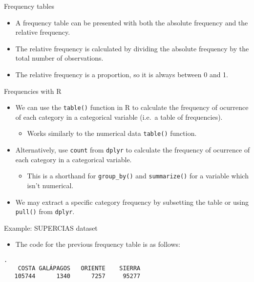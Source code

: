 \documentclass[
  10pt,
  ignorenonframetext,
]{beamer}
\newenvironment{Shaded}{\begin{snugshade}}{\end{snugshade}}
\newcommand{\FunctionTok}[1]{\textcolor[rgb]{0.28,0.35,0.67}{#1}}
\newcommand{\NormalTok}[1]{\textcolor[rgb]{0.00,0.23,0.31}{#1}}
\newcommand{\SpecialCharTok}[1]{\textcolor[rgb]{0.37,0.37,0.37}{#1}}
\providecommand{\tightlist}{%
  \setlength{\itemsep}{0pt}\setlength{\parskip}{0pt}}\usepackage{longtable,booktabs,array}
\begin{document}
\begin{frame}{Frequency tables}
\label{frequency-tables-1}
\begin{itemize}
\item
  A frequency table can be presented with both the absolute frequency
  and the relative frequency.
\item
  The relative frequency is calculated by dividing the absolute
  frequency by the total number of observations.
\item
  The relative frequency is a proportion, so it is always between 0 and
  1.
\end{itemize}
\end{frame}

\begin{frame}[fragile]{Frequencies with R}
\label{frequencies-with-r}
\begin{itemize}
\tightlist
\item
  We can use the \texttt{table()} function in R to calculate the
  frequency of ocurrence of each category in a categorical variable
  (i.e.~a table of frequencies).

  \begin{itemize}
  \tightlist
  \item
    Works similarly to the numerical data \texttt{table()} function.
  \end{itemize}
\item
  Alternatively, use \texttt{count} from \texttt{dplyr} to calculate the
  frequency of ocurrence of each category in a categorical variable.

  \begin{itemize}
  \tightlist
  \item
    This is a shorthand for \texttt{group\_by()} and
    \texttt{summarize()} for a variable which isn't numerical.
  \end{itemize}
\item
  We may extract a specific category frequency by subsetting the table
  or using \texttt{pull()} from \texttt{dplyr}.
\end{itemize}
\end{frame}

\begin{frame}[fragile]{Example: SUPERCIAS dataset}
\label{example-supercias-dataset}
\begin{itemize}
\tightlist
\item
  The code for the previous frequency table is as follows:
\end{itemize}

\begin{Shaded}
\end{Shaded}

\begin{verbatim}
.
    COSTA GALÁPAGOS   ORIENTE    SIERRA 
   105744      1340      7257     95277 
\end{verbatim}
\end{frame}
\end{document}
